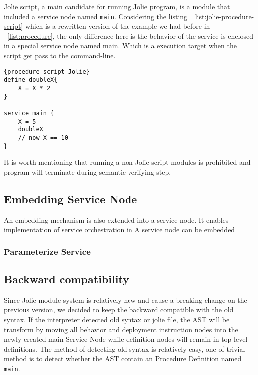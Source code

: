 Jolie script, a main candidate for running Jolie program, is a module that included a service node named \texttt{main}. Considering the listing ~\ref{list:jolie-procedure-script} which is a rewritten version of the example we had before in ~\ref{list:procedure}, the only difference here is the behavior of the service is enclosed in a special service node named main. Which is a execution target when the script get pass to the command-line.

\begin{listing}[h]
    \lstset{language=Jolie,
        style=codeStyle
    }
\begin{lstlisting}[frame=tlrb, caption= {A Jolie script version of ~\ref{list:procedure}}, label={list:jolie-procedure-script}]{procedure-script-Jolie}
define doubleX{
    X = X * 2
}

service main {
    X = 5
    doubleX
    // now X == 10
}
\end{lstlisting}
\end{listing}

It is worth mentioning that running a non Jolie script modules is prohibited and program will terminate during semantic verifying step.

\subsection{Embedding Service Node}

An embedding mechanism is also extended into a service node. It enables implementation of service orchestration in 
A service node can be embedded 

\subsubsection{Parameterize Service}

\subsection{Backward compatibility}

Since Jolie module system is relatively new and cause a breaking change on the previous version, we decided to keep the backward compatible with the old syntax. If the interpreter detected old syntax or jolie file, the AST will be transform by moving all behavior and deployment instruction nodes into the newly created main Service Node while definition nodes will remain in top level definitions. The method of detecting old syntax is relatively easy, one of trivial method is to detect whether the AST contain an Procedure Definition named \texttt{main}.

